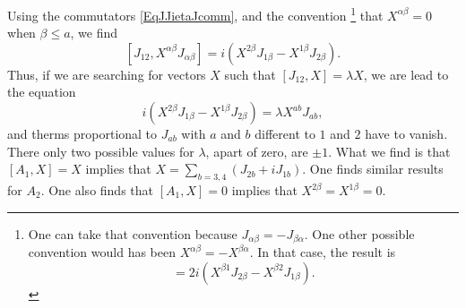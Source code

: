 Using the commutators \eqref{EqJJietaJcomm}, and the convention%
\footnote{One can take that convention because $J_{\alpha\beta}=-J_{\beta\alpha}$. One other possible convention would has been $X^{\alpha\beta}=-X^{\beta\alpha}$. In that case, the result is
\begin{equation}
	[J_{12},X^{\alpha\beta}J_{\alpha\beta}]=2i(X^{\beta 1}J_{2\beta}-X^{\beta 2}J_{1\beta}).
\end{equation}
}		%
that $X^{\alpha\beta}=0$ when $\beta\leq a$,  we find
\[
	[J_{12},X^{\alpha\beta}J_{\alpha\beta}]=i(X^{2\beta}J_{1\beta}-X^{1\beta}J_{2\beta}).
\]
Thus, if we are searching for vectors $X$ such that $[J_{12},X]=\lambda X$, we are lead to the equation
\begin{equation}
	i(X^{2\beta}J_{1\beta}-X^{1\beta}J_{2\beta})=\lambda X^{ab}J_{ab},
\end{equation}
and therms proportional to $J_{ab}$ with $a$ and $b$ different to $1$ and $2$ have to vanish. There only two possible values for $\lambda$, apart of zero,  are $\pm 1$. What we find is that $[A_1,X]=X$ implies that $X=\sum_{b=3,4}(J_{2b}+iJ_{1b})$. One finds similar results for $A_2$. One also finds that $[A_1,X]=0$ implies that $X^{2\beta}=X^{1\beta}=0$.

